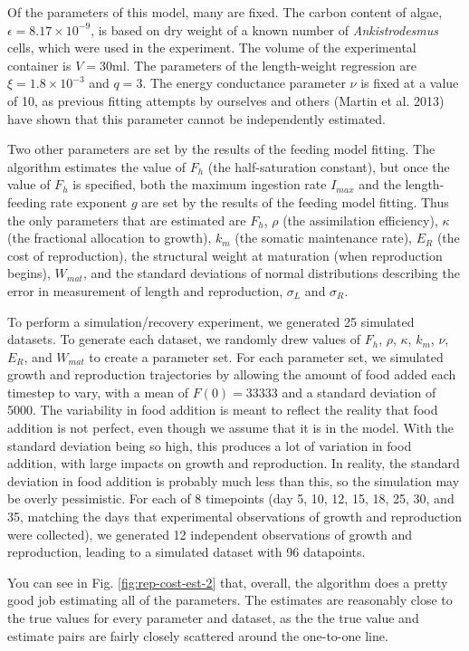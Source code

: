 \documentclass[12pt,reqno,final,pdftex]{amsart}\usepackage[]{graphicx}\usepackage[]{color}
\theoremstyle{plain}
\numberwithin{equation}{part}
\begin{document}
Of the parameters of this model, many are fixed.
The carbon content of algae, $\epsilon = 8.17 \times 10^{-9}$, is based on dry weight of a known number of \emph{Ankistrodesmus} cells, which were used in the experiment.
The volume of the experimental container is $V = 30$ml.
The parameters of the length-weight regression are $\xi = 1.8 \times 10^{-3}$ and $q = 3$.
The energy conductance parameter $\nu$ is fixed at a value of 10, as previous fitting attempts by ourselves and others (Martin et al. 2013) have shown that this parameter cannot be independently estimated.

Two other parameters are set by the results of the feeding model fitting.
The algorithm estimates the value of $F_h$ (the half-saturation constant), but once the value of $F_h$ is specified, both the maximum ingestion rate $I_{max}$ and the length-feeding rate exponent $g$ are set by the results of the feeding model fitting.
Thus the only parameters that are estimated are $F_h$, $\rho$ (the assimilation efficiency), $\kappa$ (the fractional allocation to growth), $k_m$ (the somatic maintenance rate), $E_R$ (the cost of reproduction), the structural weight at maturation (when reproduction begins), $W_{mat}$, and the standard deviations of normal distributions describing the error in measurement of length and reproduction, $\sigma_L$ and $\sigma_R$.

To perform a simulation/recovery experiment, we generated 25 simulated datasets.
To generate each dataset, we randomly drew values of $F_h$, $\rho$, $\kappa$, $k_m$, $\nu$, $E_R$, and $W_{mat}$ to create a parameter set.
For each parameter set, we simulated growth and reproduction trajectories by allowing the amount of food added each timestep to vary, with a mean of $F(0)=33333$ and a standard deviation of 5000.
The variability in food addition is meant to reflect the reality that food addition is not perfect, even though we assume that it is in the model.
With the standard deviation being so high, this produces a lot of variation in food addition, with large impacts on growth and reproduction.
In reality, the standard deviation in food addition is probably much less than this, so the simulation may be overly pessimistic.
For each of 8 timepoints (day 5, 10, 12, 15, 18, 25, 30, and 35, matching the days that experimental observations of growth and reproduction were collected), we generated 12 independent observations of growth and reproduction, leading to a simulated dataset with 96 datapoints.

You can see in Fig. \ref{fig:rep-cost-est-2} that, overall, the algorithm does a pretty good job estimating all of the parameters.
The estimates are reasonably close to the true values for every parameter and dataset, as the the true value and estimate pairs are fairly closely scattered around the one-to-one line.
\end{document}
